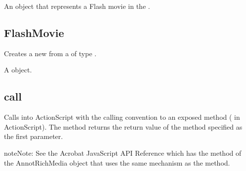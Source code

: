 \documentclass[letterpaper,12pt,english,openany,oneside]{sphinxmanual}
\begin{document}
An object that represents a Flash movie in the .

\label{\detokenize{JS_3D_API:properties-9}}


\subsection{FlashMovie}
\label{\detokenize{JS_3D_API:flashmovie-1}}\label{\detokenize{JS_3D_API:id7}}
Creates a new  from a  of type .

\label{\detokenize{JS_3D_API:syntax-20}}

\begin{sphinxVerbatim}[commandchars=\\\{\}]
\end{sphinxVerbatim}
\label{\detokenize{JS_3D_API:parameters-13}}

\label{\detokenize{JS_3D_API:section-24}}\label{\detokenize{JS_3D_API:returns-20}}

A  object.


\subsection{call}
\label{\detokenize{JS_3D_API:call}}
Calls into ActionScript with the  calling convention to an exposed method ( in ActionScript). The  method returns the return value of the method specified as the first parameter.

\begin{sphinxadmonition}{note}{Note:}
See the Acrobat JavaScript API Reference which has the  method of the AnnotRichMedia object that uses the same mechanism as the  method.
\end{sphinxadmonition}
\label{\detokenize{JS_3D_API:syntax-21}}

\begin{sphinxVerbatim}[commandchars=\\\{\}]
 \PYG{p}{[}\PYG{p}{[} \PYG{p}{]}\PYG{p}{]}
\end{sphinxVerbatim}
\label{\detokenize{JS_3D_API:parameters-14}}
\end{document}
